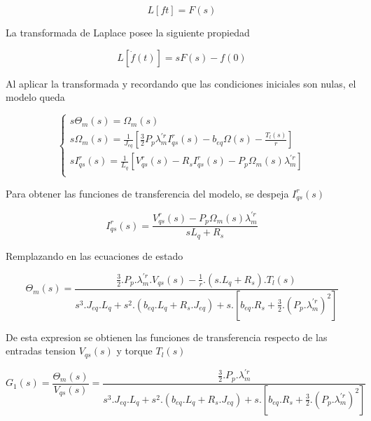 \documentclass{article}
\begin{document}
\begin{equation}
        L[f{t}] = F(s)
\end{equation}

La transformada de Laplace posee la siguiente propiedad

\begin{equation}
        L[\dot{f}(t)] = s F(s) - f(0)
\end{equation}

Al aplicar la transformada y recordando que las condiciones iniciales son nulas, el 
modelo queda

\begin{equation}
    \begin{cases}
        s\Theta_{m}(s) = \Omega_{m}(s)\\
        s\Omega_{m}(s) = \frac{1}{J_{eq}}[\frac{3}{2} P_{p} \lambda_{m}^{\prime r} I_{qs}^r(s) - b_{eq}\Omega(s) - \frac{T_{l}(s)}{r}]\\
        s I_{qs}^r(s) = \frac{1}{L_{q}}[V_{qs}^r(s) - R_{s}I_{qs}^r(s) - P_{p}\Omega_{m}(s)\lambda_{m}^{\prime r}]\\
    \end{cases}
\end{equation}

Para obtener las funciones de transferencia del modelo, se despeja $I_{qs}^r(s)$

\begin{equation}
    I_{qs}^r(s) = \frac{V_{qs}^r(s) - P_{p}\Omega_{m}(s)\lambda_{m}^{\prime r}}{s L_{q} + R_{s}}
\end{equation}
 
Remplazando en las ecuaciones de estado 

\begin{equation}
    \Theta_{m}(s) = \frac{\frac{3}{2}.P_{p}.\lambda_{m}^{\prime r}.V_{qs}(s) - \frac{1}{r}.(s.L_{q}+R_{s}).T_{l}(s)}{s^3.J_{eq}.L_{q} + s^2.(b_{eq}.L_{q} +  R_{s}.J_{eq}) + s.[b_{eq}.R_{s}+\frac{3}{2}.(P_{p}.\lambda_{m}^{\prime r})^2]}
\end{equation}

De esta expresion se obtienen las funciones de transferencia respecto de las entradas tension $V_{qs}(s)$ y torque $T_{l}(s)$

\begin{equation}
    G_{1}(s) = \frac{\Theta_{m}(s)}{V_{qs}(s)} = \frac{\frac{3}{2}.P_{p}.\lambda_{m}^{\prime r}}{s^3.J_{eq}.L_{q} + s^2.(b_{eq}.L_{q} +  R_{s}.J_{eq}) + s.[b_{eq}.R_{s}+\frac{3}{2}.(P_{p}.\lambda_{m}^{\prime r})^2]}
\end{equation}
\end{document}
